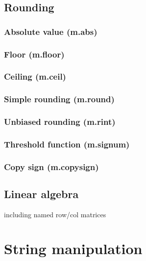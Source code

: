 \documentclass{article}
\theoremstyle{definition}
\begin{document}
\subsection{Rounding}

\subsubsection{Absolute value (m.abs)}

\subsubsection{Floor (m.floor)}

\subsubsection{Ceiling (m.ceil)}

\subsubsection{Simple rounding (m.round)}

\subsubsection{Unbiased rounding (m.rint)}

\subsubsection{Threshold function (m.signum)}

\subsubsection{Copy sign (m.copysign)}

\subsection{Linear algebra}

including named row/col matrices

\pagebreak

\section{String manipulation}
\end{document}
